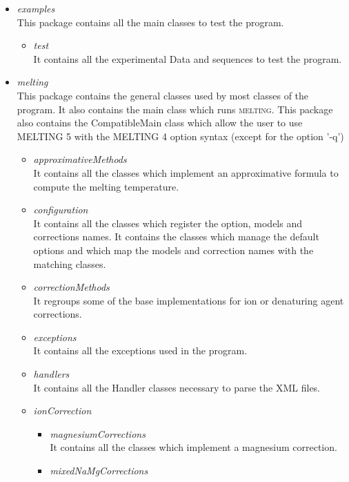\documentclass{article}
\begin{document}
\begin{itemize}
  \item \textit{examples} \\
  This package contains all the main classes to test the program.
    \begin{itemize}
    \item \textit{test} \\
    It contains all the experimental Data and sequences to test the program.
    \end{itemize}
  \item \textit{melting} \\
  This package contains the general classes used by most classes of the program. It also
  contains the main class which runs \textsc{melting}. This package also contains the CompatibleMain
  class which allow the user to use MELTING 5 with the MELTING 4 option syntax (except for the option '-q') 
    \begin{itemize}
    \item \textit{approximativeMethods} \\
    It contains all the classes which implement an approximative formula to compute the melting
    temperature.
    \item \textit{configuration} \\
    It contains all the classes which register the option, models and corrections names. It contains
    the classes which manage the default options and which map the models and correction names with the
    matching classes.
    \item \textit{correctionMethods} \\
    It regroups some of the base implementations for ion or denaturing agent corrections.
    \item \textit{exceptions} \\
    It contains all the exceptions used in the program.
    \item \textit{handlers} \\
    It contains all the Handler classes necessary to parse the XML files.
    \item \textit{ionCorrection} \\
      \begin{itemize}
      \item \textit{magnesiumCorrections} \\
      It contains all the classes which implement a magnesium correction.
      \item \textit{mixedNaMgCorrections} \\

\end{itemize}
\end{itemize}
\end{itemize}
\end{document}
